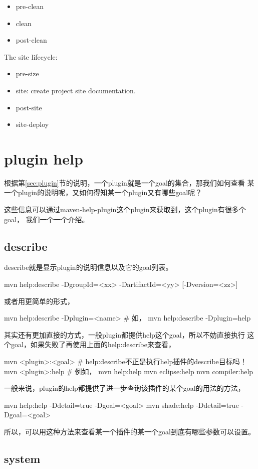\documentclass[a4paper,11pt]{article}
\begin{document}
\begin{itemize}
\item pre-clean
\item clean
\item post-clean
\end{itemize}

The site lifecycle:
\begin{itemize}
\item pre-size
\item site: create project site documentation.
\item post-site
\item site-deploy
\end{itemize}


\section[plugin help]{plugin help}
根据第\ref{sec:plugin}节的说明，一个plugin就是一个goal的集合，那我们如何查看
某一个plugin的说明呢，又如何得知某一个plugin又有哪些goal呢？

这些信息可以通过maven-help-plugin这个plugin来获取到，这个plugin有很多个goal，
我们一个一个介绍。

\subsection[describe]{describe}
describe就是显示plugin的说明信息以及它的goal列表。

\begin{bashcode}
  mvn help:describe -DgroupId=<xx> -DartifactId=<yy> [-Dversion=<zz>]
\end{bashcode}

或者用更简单的形式，

\begin{bashcode}
  mvn help:describe -Dplugin=<name>
  # 如，
  mvn help:describe -Dplugin=help
\end{bashcode}

其实还有更加直接的方式，一般plugin都提供help这个goal，所以不妨直接执行
这个goal，如果失败了再使用上面的help:describe来查看，

\begin{bashcode}
  mvn <plugin>:<goal>
  # help:describe不正是执行help插件的describe目标吗！
  mvn <plugin>:help
  # 例如，
  mvn help:help
  mvn eclipse:help
  mvn compiler:help
\end{bashcode}

一般来说，plugin的help都提供了进一步查询该插件的某个goal的用法的方法，

\begin{bashcode}
  mvn help:help -Ddetail=true -Dgoal=<goal>
  mvn shade:help -Ddetail=true -Dgoal=<goal>
\end{bashcode}

所以，可以用这种方法来查看某一个插件的某一个goal到底有哪些参数可以设置。

\subsection[system]{system}
\end{document}
